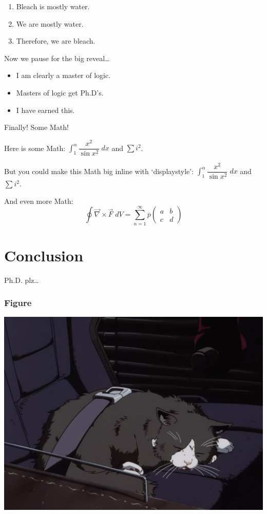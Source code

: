 \documentclass{beamer}
\newcommand{\ds}{\displaystyle}
\newcommand{\ov}[1]{\overline{#1}}
\newcommand{\twomatrix}[4]{\begin{pmatrix} #1 & #2 \\ #3 & #4 \end{pmatrix}}
\theoremstyle{definition}
\numberwithin{equation}{section}
\begin{document}
	
	
	\begin{frame}
		\begin{enumerate}[1.]
			\item Bleach is mostly water. \pause
			\item We are mostly water. \pause
			\item Therefore, we are bleach.
		\end{enumerate} \vspace{0.5cm}
		
		Now we pause for the big reveal\dots \pause \vspace{0.3cm}
		
		\begin{itemize}
			\item I am clearly a master of logic.
			\item Masters of logic get Ph.D's.
			\item I have earned this.
		\end{itemize}
	\end{frame}
	
	
	

	\begin{frame}
		Finally! Some Math! \vspace{1cm}
		
		Here is some Math: $\int_1^\alpha \dfrac{x^2}{\sin x^2} \;dx$ and $\sum i^2$. \vspace{1cm}
		
		But you could make this Math big inline with `displaystyle': $\ds \int_1^\alpha \dfrac{x^2}{\sin x^2} \;dx$ and $\ds \sum i^2$. \vspace{1cm}
		
		And even more Math:
		\[
		\oint \vec{\nabla} \times \vec{F} \;dV = \sum_{n=1}^\infty \ov{p} \twomatrix{a}{b}{c}{d}
		\]
	\end{frame}
	
	
	
	\section{Conclusion}
	
	
	
	\begin{frame}
		Ph.D. plz\dots
	\end{frame}


    \begin{frame}
    	\frametitle{Figure}
    	\begin{center}
    		\includegraphics[width=0.5\linewidth]{./image/test}    %
    	\end{center}
    \end{frame}
\end{document}
